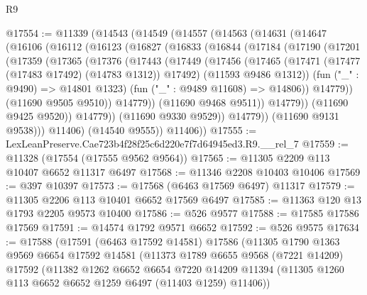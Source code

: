 \begin{lexlean}{R9}
\begin{coremodule}
@17554 := @11339
    (@14543
      (@14549
        (@14557
          (@14563
            (@14631
              (@14647
                (@16106
                  (@16112
                    (@16123
                      (@16827
                        (@16833
                          (@16844
                            (@17184
                              (@17190
                                (@17201
                                  (@17359
                                    (@17365
                                      (@17376
                                        (@17443
                                          (@17449
                                            (@17456
                                              (@17465
                                                (@17471
                                                  (@17477 (@17483 @17492) (@14783 @1312))
                                                  @17492)
                                                (@11593 @9486 @1312))
                                              (fun ("_" : @9490) => @14801 @1323)
                                              (fun ("_" : @9489 @11608) => @14806))
                                            @14779))
                                        (@11690 @9505 @9510))
                                      @14779))
                                  (@11690 @9468 @9511))
                                @14779))
                            (@11690 @9425 @9520))
                          @14779))
                      (@11690 @9330 @9529))
                    @14779))
                (@11690 @9131 @9538)))
            @11406)
          (@14540 @9555))
        @11406))
@17555 := LexLeanPreserve.Cae723b4f28f25c6d220e7f7d64945ed3.R9.__rel_7
@17559 := @11328 (@17554 (@17555 @9562 @9564))
@17565 := @11305 @2209 @113 @10407 @6652 @11317 @6497
@17568 := @11346 @2208 @10403 @10406
@17569 := @397 @10397
@17573 := @17568 (@6463 @17569 @6497) @11317
@17579 := @11305 @2206 @113 @10401 @6652 @17569 @6497
@17585 := @11363 @120 @13 @1793 @2205 @9573 @10400
@17586 := @526 @9577
@17588 := @17585 @17586 @17569
@17591 := @14574 @1792 @9571 @6652
@17592 := @526 @9575
@17634 := @17588
    (@17591
      (@6463 @17592 @14581)
      @17586
      (@11305
        @1790
        @1363
        @9569
        @6654
        @17592
        @14581
        (@11373
          @1789
          @6655
          @9568
          (@7221 @14209)
          @17592
          (@11382
            @1262
            @6652
            @6654
            @7220
            @14209
            @11394
            (@11305 @1260 @113 @6652 @6652 @1259 @6497 (@11403 @1259) @11406))

\end{coremodule}
\end{lexlean}
